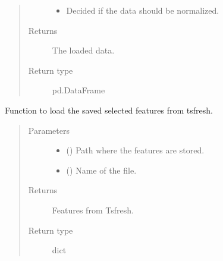 \documentclass[letterpaper,10pt,english]{sphinxmanual}
\begin{document}
\begin{fulllineitems}
\begin{quote}
\begin{description}
\begin{itemize}
\item {} 
\sphinxAtStartPar
{} \textendash{} Decided if the data should be normalized.

\end{itemize}

\item[{Returns}] \leavevmode
\sphinxAtStartPar
The loaded data.

\item[{Return type}] \leavevmode
\sphinxAtStartPar
pd.DataFrame

\end{description}\end{quote}

\end{fulllineitems}


\begin{fulllineitems}
\label{\detokenize{anoog.io:anoog.io.data_io.load_features}}
\sphinxAtStartPar
Function to load the saved selected features from tsfresh.
\begin{quote}\begin{description}
\item[{Parameters}] \leavevmode\begin{itemize}
\item {} 
\sphinxAtStartPar
{} () \textendash{} Path where the features are stored.

\item {} 
\sphinxAtStartPar
{} (\sphinxstyleliteralemphasis{\sphinxupquote{, }}) \textendash{} Name of the file.

\end{itemize}

\item[{Returns}] \leavevmode
\sphinxAtStartPar
Features from Tsfresh.

\item[{Return type}] \leavevmode
\sphinxAtStartPar
dict

\end{description}\end{quote}

\end{fulllineitems}
\end{document}
